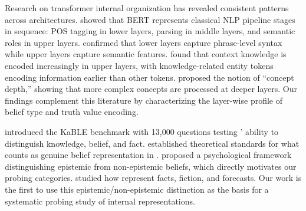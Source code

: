 Research on transformer internal organization has revealed consistent patterns across architectures. \citet{tenney2019bert} showed that BERT represents classical NLP pipeline stages in sequence: POS tagging in lower layers, parsing in middle layers, and semantic roles in upper layers. \citet{jawahar2019does} confirmed that lower layers capture phrase-level syntax while upper layers capture semantic features. \citet{ju2024large} found that context knowledge is encoded increasingly in upper layers, with knowledge-related entity tokens encoding information earlier than other tokens. \citet{jin2024exploring} proposed the notion of ``concept depth,'' showing that more complex concepts are processed at deeper layers. Our findings complement this literature by characterizing the layer-wise profile of belief type and truth value encoding.

\citet{suzgun2024belief} introduced the KaBLE benchmark with 13,000 questions testing \llms' ability to distinguish knowledge, belief, and fact. \citet{herrmann2024standards} established theoretical standards for what counts as genuine belief representation in \llms. \citet{vesga2025psychological} proposed a psychological framework distinguishing epistemic from non-epistemic beliefs, which directly motivates our probing categories. \citet{li2025representations} studied how \llms represent facts, fiction, and forecasts. Our work is the first to use this epistemic/non-epistemic distinction as the basis for a systematic probing study of internal representations.
